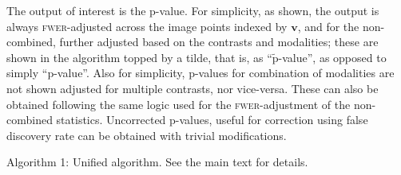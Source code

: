 The output of interest is the p-value. For simplicity, as shown, the output is always \textsc{fwer}-adjusted across the image points indexed by $\mathbf{v}$, and for the non-combined, further adjusted based on the contrasts and modalities; these are shown in the algorithm topped by a tilde, that is, as ``$\tilde{\text{p}}$-value'', as opposed to simply ``p-value''. Also for simplicity, p-values for combination of modalities are not shown adjusted for multiple contrasts, nor vice-versa. These can also be obtained following the same logic used for the \textsc{fwer}-adjustment of the non-combined statistics. Uncorrected p-values, useful for correction using false discovery rate \citep[\textsc{fdr},][]{Benjamini1995} can be obtained with trivial modifications. 

\vspace{4mm}
\singlespacing
\noindent Algorithm 1: Unified algorithm. See the main text for details.\\
\HRule
\vspace{1mm}
\algrenewcommand\algorithmicindent{1em}
